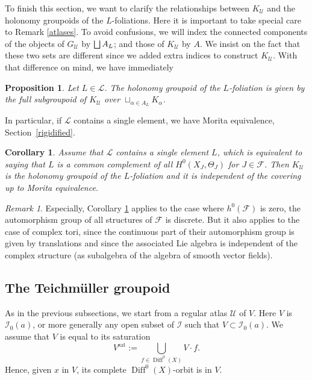 \documentclass[JEP,XML,SOM,Unicode]{cedram}
\let\mathcal\mathscr
\let\oldbigsqcup\bigsqcup
\renewcommand{\bigsqcup}{\mathop{\textstyle\oldbigsqcup}\displaylimits}
\newcommand{\sat}{\mathrm{sat}}
\DeclareMathOperator{\Diff}{Diff}
\theoremstyle{plain}
\newtheorem{corollary}[theorem]{Corollary}
\newtheorem{proposition}[theorem]{Proposition}
\theoremstyle{definition}
\theoremstyle{remark}
\newtheorem{remark}[theorem]{Remark}
\numberwithin{equation}{section}
\newcommand{\cI}{\mathcal{I}}
\begin{document}
To finish this section, we want to clarify the relationships between $K_{\mathcal U}$ and the holonomy groupoids of the $L$-foliations. Here it is important to take special care to Remark \ref{atlases}. To avoid confusions, we will index the connected components of the objects of $G_{\mathcal U}$ by $\bigsqcup A_L$; and those of $K_{\mathcal U}$ by $A$. We insist on the fact that these two sets are different since we added extra indices to construct $K_{\mathcal U}$. With that difference on mind, we have immediately

\begin{proposition}
\label{autregroupoid}
Let $L\in\mathcal L$. The holonomy groupoid of the $L$-foliation is given by the full subgroupoid of $K_{\mathcal U}$ over $\sqcup_{\alpha\in A_L}K_\alpha$.
\end{proposition}

In particular, if $\mathcal L$ contains a single element, we have Morita equivalence, \cf Section~\ref{rigidified}.

\begin{corollary}
\label{groupoidIIbis}
Assume that $\mathcal L$ contains a single element $L$, which is equivalent to saying that $L$ is a common complement of all $H^0(X_J,\Theta_J)$ for $J\in \mathcal F$. Then $K_{\mathcal U}$ is the holonomy groupoid of the $L$-foliation and it is independent of the covering up to Morita equivalence.
\end{corollary}

\begin{remark}
\label{applicor}
Especially, Corollary \ref{groupoidIIbis} applies to the case where $h^0(\mathcal F)$ is zero, \ie the automorphism group of all structures of $\mathcal F$ is discrete. But it also applies to the case of complex tori, since the continuous part of their automorphism group is given by translations and since the associated Lie algebra is independent of the complex structure (as subalgebra of the algebra of smooth vector fields). \end{remark}

\subsection{The Teichmüller groupoid}
\label{Teichsub}
As in the previous subsections, we start from a regular atlas $\mathcal U$ of $V$. Here $V$ is $\cI_0(a)$, or more generally any open subset of $\cI$ such that $V\subset \cI_0(a)$. We assume that $V$ is equal to its saturation
\begin{equation}
\label{sat}
V^{\sat}:=\bigcup_{f\in\Diff^0(X)}V\cdot f.
\end{equation}
Hence, given $x$ in $V$, its complete $\Diff^0(X)$-orbit is in $V$.
\end{document}
